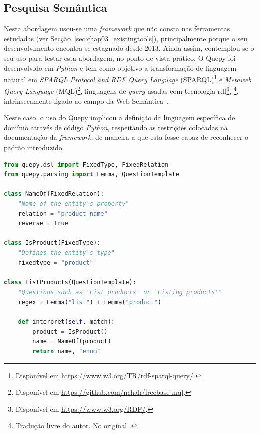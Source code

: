 \subsection{Pesquisa Semântica}
Nesta abordagem usou-se uma \textit{framework} que não consta nas ferramentas estudadas (ver Secção~\ref{sec:chap03_existingtools}), principalmente porque o seu desenvolvimento encontra-se estagnado desde 2013. Ainda assim, contemplou-se o seu uso para testar esta abordagem, no ponto de vista prático. O Quepy foi desenvolvido em \textit{Python} e tem como objetivo a transformação de linguagem natural em \textit{SPARQL Protocol and RDF Query Language} (SPARQL)\footnote{Disponível em \url{https://www.w3.org/TR/rdf-sparql-query/}.} e \textit{Metaweb Query Language} (MQL)\footnote{Disponível em \url{https://github.com/nchah/freebase-mql}.}, linguagens de \textit{query} usadas com tecnologia \gls{rdf}\footnote{Disponível em \url{https://www.w3.org/RDF/}.}, \footnote{Tradução livre do autor. No original .}, intrinsecamente ligado ao campo da Web Semântica~\parencite{resource_description_framework}.

Neste caso, o uso do Quepy implicou a definição da linguagem específica de domínio através de código \textit{Python}, respeitando as restrições colocadas na documentação da \textit{framework}, de maneira a que esta fosse capaz de reconhecer o padrão introduzido.

\begin{lstlisting}[language=python, caption={Excerto da definição semântica da frase que lida com listagem de produtos},numbers=none,label=lst:quepyexample,basicstyle=\scriptsize]
from quepy.dsl import FixedType, FixedRelation
from quepy.parsing import Lemma, QuestionTemplate

class NameOf(FixedRelation):
    "Name of the entity's property"
    relation = "product_name"
    reverse = True

class IsProduct(FixedType):
    "Defines the entity's type"
    fixedtype = "product"

class ListProducts(QuestionTemplate):
    "Questions such as 'List products' or 'Listing products'"
    regex = Lemma("list") + Lemma("product")

    def interpret(self, match):
        product = IsProduct()
        name = NameOf(product)
        return name, "enum"

\end{lstlisting}

